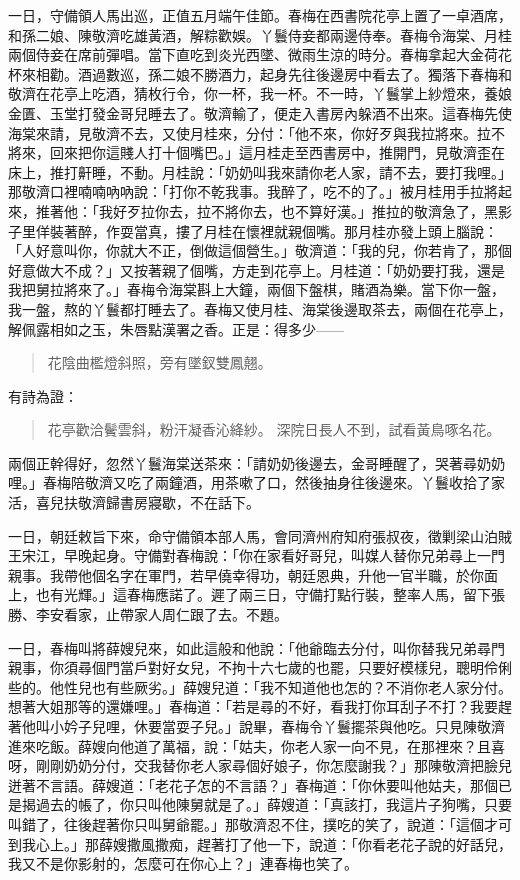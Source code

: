 一日，守備領人馬出巡，正值五月端午佳節。春梅在西書院花亭上置了一卓酒席，和孫二娘、陳敬濟吃雄黃酒，解粽歡娛。丫鬟侍妾都兩邊侍奉。春梅令海棠、月桂兩個侍妾在席前彈唱。當下直吃到炎光西墜、微雨生涼的時分。春梅拿起大金荷花杯來相勸。酒過數巡，孫二娘不勝酒力，起身先往後邊房中看去了。獨落下春梅和敬濟在花亭上吃酒，猜枚行令，你一杯，我一杯。不一時，丫鬟掌上紗燈來，養娘金匱、玉堂打發金哥兒睡去了。敬濟輸了，便走入書房內躲酒不出來。這春梅先使海棠來請，見敬濟不去，又使月桂來，分付：「他不來，你好歹與我拉將來。拉不將來，回來把你這賤人打十個嘴巴。」這月桂走至西書房中，推開門，見敬濟歪在床上，推打鼾睡，不動。月桂說：「奶奶叫我來請你老人家，請不去，要打我哩。」那敬濟口裡喃喃吶吶說：「打你不乾我事。我醉了，吃不的了。」被月桂用手拉將起來，推著他：「我好歹拉你去，拉不將你去，也不算好漢。」推拉的敬濟急了，黑影子里佯裝著醉，作耍當真，摟了月桂在懷裡就親個嘴。那月桂亦發上頭上腦說：「人好意叫你，你就大不正，倒做這個營生。」敬濟道：「我的兒，你若肯了，那個好意做大不成？」又按著親了個嘴，方走到花亭上。月桂道：「奶奶要打我，還是我把舅拉將來了。」春梅令海棠斟上大鐘，兩個下盤棋，賭酒為樂。當下你一盤，我一盤，熬的丫鬟都打睡去了。春梅又使月桂、海棠後邊取茶去，兩個在花亭上，解佩露相如之玉，朱唇點漢署之香。正是：得多少——
\begin{quote}
花陰曲檻燈斜照，旁有墜釵雙鳳翹。
\end{quote}
有詩為證：
\begin{quote}
花亭歡洽鬢雲斜，粉汗凝香沁絳紗。
深院日長人不到，試看黃鳥啄名花。
\end{quote}

兩個正幹得好，忽然丫鬟海棠送茶來：「請奶奶後邊去，金哥睡醒了，哭著尋奶奶哩。」春梅陪敬濟又吃了兩鐘酒，用茶嗽了口，然後抽身往後邊來。丫鬟收拾了家活，喜兒扶敬濟歸書房寢歇，不在話下。

一日，朝廷敕旨下來，命守備領本部人馬，會同濟州府知府張叔夜，徵剿梁山泊賊王宋江，早晚起身。守備對春梅說：「你在家看好哥兒，叫媒人替你兄弟尋上一門親事。我帶他個名字在軍門，若早僥幸得功，朝廷恩典，升他一官半職，於你面上，也有光輝。」這春梅應諾了。遲了兩三日，守備打點行裝，整率人馬，留下張勝、李安看家，止帶家人周仁跟了去。不題。

一日，春梅叫將薛嫂兒來，如此這般和他說：「他爺臨去分付，叫你替我兄弟尋門親事，你須尋個門當戶對好女兒，不拘十六七歲的也罷，只要好模樣兒，聰明伶俐些的。他性兒也有些厥劣。」薛嫂兒道：「我不知道他也怎的？不消你老人家分付。想著大姐那等的還嫌哩。」春梅道：「若是尋的不好，看我打你耳刮子不打？我要趕著他叫小妗子兒哩，休要當耍子兒。」說畢，春梅令丫鬟擺茶與他吃。只見陳敬濟進來吃飯。薛嫂向他道了萬福，說：「姑夫，你老人家一向不見，在那裡來？且喜呀，剛剛奶奶分付，交我替你老人家尋個好娘子，你怎麼謝我？」那陳敬濟把臉兒迸著不言語。薛嫂道：「老花子怎的不言語？」春梅道：「你休要叫他姑夫，那個已是揭過去的帳了，你只叫他陳舅就是了。」薛嫂道：「真該打，我這片子狗嘴，只要叫錯了，往後趕著你只叫舅爺罷。」那敬濟忍不住，撲吃的笑了，說道：「這個才可到我心上。」那薛嫂撒風撒痴，趕著打了他一下，說道：「你看老花子說的好話兒，我又不是你影射的，怎麼可在你心上？」連春梅也笑了。

